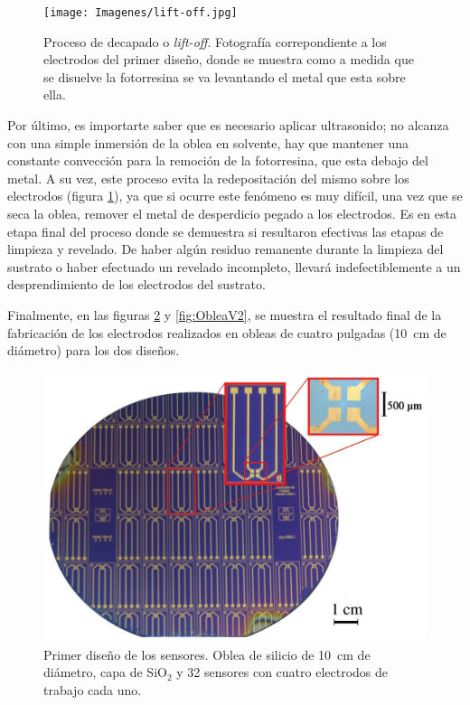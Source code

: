 					  \begin{figure}[ht!]
					  \begin{center}
					  \texttt{[image: Imagenes/lift-off.jpg]}
					  \caption[Proceso de decapado o\textit{ lift-off}]{Proceso de decapado o\textit{ lift-off}. Fotografía correpondiente a los electrodos del primer diseño, donde se muestra como a medida que se disuelve la fotorresina se va levantando el metal que esta sobre ella.}
					  \label{fig:ultrasonido}
					  \end{center}
					  \end{figure}

		 Por último, es importarte saber que es necesario aplicar ultrasonido; no alcanza con una simple inmersión de la oblea en solvente, hay que mantener una constante convección para la remoción de la fotorresina, que esta debajo del metal. A su vez, este proceso evita la redepositación del mismo sobre los electrodos (figura \ref{fig:ultrasonido}), ya que si ocurre este fenómeno es muy difícil, una vez que se seca la oblea, remover el metal de desperdicio pegado a los electrodos. Es en esta etapa final del proceso donde se demuestra si resultaron efectivas las etapas de limpieza y revelado. De haber algún residuo remanente durante la limpieza del sustrato o haber efectuado un revelado incompleto, llevará indefectiblemente a un desprendimiento de los electrodos del sustrato.

		 Finalmente, en las figuras \ref{fig:ObleaV1} y \ref{fig:ObleaV2}, se muestra el resultado final de la fabricación de los electrodos realizados en obleas de cuatro pulgadas (\SI{10}{\cm} de diámetro) para los dos diseños.

					  \begin{figure}[ht!]
					  \begin{center}
					  \includegraphics[width=\textwidth]{Imagenes/ObleaV1.jpg}
					  \caption[Electrodos, primera versión]{Primer diseño de los sensores. Oblea de silicio de \SI{10}{cm} de diámetro, capa de SiO$_2$ y 32 sensores con cuatro electrodos de trabajo cada uno.}
					  \label{fig:ObleaV1}
					  \end{center}
					  \end{figure} 	

